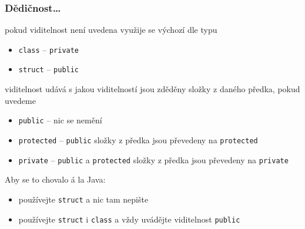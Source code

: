 \begin{frame}[fragile]
\frametitle{Dědičnost\ldots}
\begin{bitemize}
\item pokud viditelnost není uvedena využije se výchozí dle typu
\begin{itemize}
\item \lstinline|class| -- \lstinline|private|
\item \lstinline|struct| -- \lstinline|public|
\end{itemize}
\item viditelnost udává s jakou viditelností jsou zděděny složky z daného předka, pokud uvedeme
\begin{itemize}
\item \lstinline|public| -- nic se nemění
\item \lstinline|protected| -- \lstinline|public| složky z předka jsou převedeny na \lstinline|protected|
\item \lstinline|private| -- \lstinline|public| a \lstinline|protected| složky z předka jsou převedeny na \lstinline|private|
\end{itemize}
\end{bitemize}

\begin{noteblock}{}
Aby se to chovalo á la Java:
\begin{itemize}
\item používejte \lstinline|struct| a nic tam nepište
\item používejte \lstinline|struct| i \lstinline|class| a vždy uvádějte viditelnost \lstinline|public|
\end{itemize}
\end{noteblock}
\end{frame}






